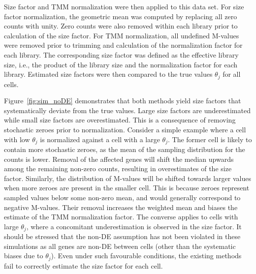 \documentclass{article}
\begin{document}
Size factor and TMM normalization were then applied to this data set.
For size factor normalization, the geometric mean was computed by replacing all zero counts with unity.
Zero counts were also removed within each library prior to calculation of the size factor.
For TMM normalization, all undefined M-values were removed prior to trimming and calculation of the normalization factor for each library.
The corresponding size factor was defined as the effective library size, i.e., the product of the library size and the normalization factor for each library.
Estimated size factors were then compared to the true values $\theta_j$ for all cells.

Figure~\ref{fig:sim_noDE} demonstrates that both methods yield size factors that systematically deviate from the true values.
Large size factors are underestimated while small size factors are overestimated.
This is a consequence of removing stochastic zeroes prior to normalization.
Consider a simple example where a cell with low $\theta_j$ is normalized against a cell with a large $\theta_j$. 
The former cell is likely to contain more stochastic zeroes, as the mean of the sampling distribution for the counts is lower.
Removal of the affected genes will shift the median upwards among the remaining non-zero counts, resulting in overestimates of the size factor.
Similarly, the distribution of M-values will be shifted towards larger values when more zeroes are present in the smaller cell.
This is because zeroes represent sampled values below some non-zero mean, and would generally correspond to negative M-values.
Their removal increases the weighted mean and biases the estimate of the TMM normalization factor.
The converse applies to cells with large $\theta_j$, where a concomitant underestimation is observed in the size factor.
It should be stressed that the non-DE assumption has not been violated in these simulations as all genes are non-DE between cells (other than the systematic biases due to $\theta_j$).
Even under such favourable conditions, the existing methods fail to correctly estimate the size factor for each cell.
\end{document}
